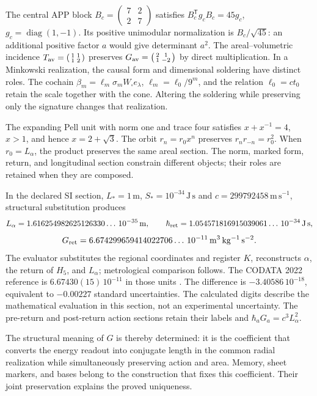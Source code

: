 The central APP block
$B_c=\left(\begin{smallmatrix}7&2\\2&7\end{smallmatrix}\right)$
satisfies $B_c^{\mathsf T}g_cB_c=45g_c$,
$g_c=\operatorname{diag}(1,-1)$. Its positive unimodular normalization is
$B_c/\sqrt{45}$: an additional positive factor $a$ would give determinant
$a^2$. The areal--volumetric incidence
$T_{\rm av}=\left(\begin{smallmatrix}1&1\\1&2\end{smallmatrix}\right)$
preserves
$G_{\rm av}=\left(\begin{smallmatrix}2&1\\1&-2\end{smallmatrix}\right)$
by direct multiplication.
In a Minkowski realization, the causal form and dimensional soldering
have distinct roles. The cochain
$\beta_m=\ell_m\sigma_mW_\square e_\lambda$,
$\ell_m=\ell_0/9^m$, and the relation $\ell_0=ct_0$ retain the scale
together with the cone. Altering the soldering while preserving only
the signature changes that realization.

The expanding Pell unit with norm one and trace four satisfies
$x+x^{-1}=4$, $x>1$, and hence $x=2+\sqrt3$.
The orbit $r_n=r_0x^n$ preserves $r_nr_{-n}=r_0^2$.
When $r_0=L_\alpha$, the product preserves the same areal section.
The norm, marked form, return, and longitudinal section constrain
different objects; their roles are retained when they are composed.

In the declared SI section, $L_*=1\,\mathrm m$,
$S_*=10^{-34}\,\mathrm{J\,s}$ and $c=299792458\,\mathrm{m\,s^{-1}}$,
structural substitution produces
\[
 L_\alpha=1.616254982625126330\ldots\,10^{-35}\,\mathrm m,\qquad
 \hbar_{\rm ret}=1.054571816915039061\ldots\,10^{-34}\,\mathrm{J\,s},
\]
\begin{equation}
 G_{\rm ret}=6.674299659414022706\ldots\,10^{-11}
 \,\mathrm{m^3\,kg^{-1}\,s^{-2}}.
 \label{md:rigidez:valor}
\end{equation}
The evaluator substitutes the regional coordinates and register $K$,
reconstructs $\alpha$, the return of $H_5$, and $L_\alpha$;
metrological comparison follows. The CODATA 2022 reference is
$6.67430(15)\,10^{-11}$ in those units \cite{codata2022}.
The difference is $-3.40586\,10^{-18}$, equivalent to
$-0.00227$ standard uncertainties. The calculated digits describe the
mathematical evaluation in this section, not an experimental uncertainty.
The pre-return and post-return action sections retain their labels and
$\hbar_aG_a=c^3L_\alpha^2$.

The structural meaning of $G$ is thereby determined: it is the
coefficient that converts the energy readout into conjugate length in
the common radial realization while simultaneously preserving action
and area. Memory, sheet markers, and bases belong to the construction
that fixes this coefficient. Their joint preservation explains the
proved uniqueness.
